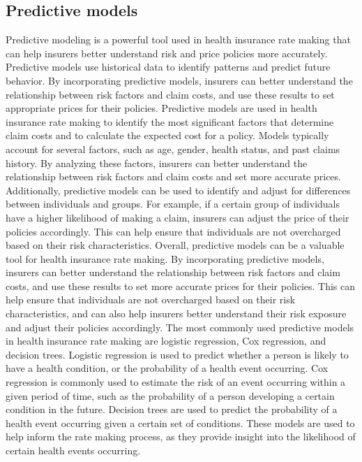 \documentclass[12pt]{article}
\theoremstyle{definition}
\theoremstyle{remark}
\begin{document}
\subsection{Predictive models}\label{predmodels}
Predictive modeling is a powerful tool used in health insurance rate making that can help insurers better understand risk and price policies more accurately. Predictive models use historical data to identify patterns and predict future behavior. By incorporating predictive models, insurers can better understand the relationship between risk factors and claim costs, and use these results to set appropriate prices for their policies. Predictive models are used in health insurance rate making to identify the most significant factors that determine claim costs and to calculate the expected cost for a policy. Models typically account for several factors, such as age, gender, health status, and past claims history. By analyzing these factors, insurers can better understand the relationship between risk factors and claim costs and set more accurate prices. Additionally, predictive models can be used to identify and adjust for differences between individuals and groups. For example, if a certain group of individuals have a higher likelihood of making a claim, insurers can adjust the price of their policies accordingly. This can help ensure that individuals are not overcharged based on their risk characteristics. Overall, predictive models can be a valuable tool for health insurance rate making. By incorporating predictive models, insurers can better understand the relationship between risk factors and claim costs, and use these results to set more accurate prices for their policies. This can help ensure that individuals are not overcharged based on their risk characteristics, and can also help insurers better understand their risk exposure and adjust their policies accordingly.
The most commonly used predictive models in health insurance rate making are logistic regression, Cox regression, and decision trees. Logistic regression is used to predict whether a person is likely to have a health condition, or the probability of a health event occurring. Cox regression is commonly used to estimate the risk of an event occurring within a given period of time, such as the probability of a person developing a certain condition in the future. Decision trees are used to predict the probability of a health event occurring given a certain set of conditions. These models are used to help inform the rate making process, as they provide insight into the likelihood of certain health events occurring.
\end{document}
